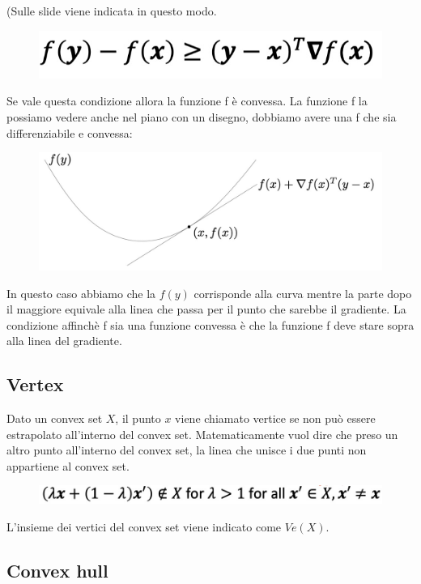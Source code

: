 \documentclass[14pt]{extreport}
\begin{document}
(Sulle slide viene indicata in questo modo.

\begin{figure}[H]
\centering
\includegraphics[width=0.7\linewidth]{227.jpeg}
\end{figure}

Se vale questa condizione allora la funzione f è convessa. La funzione f la possiamo vedere anche nel piano con un disegno, dobbiamo avere una f che
sia differenziabile e convessa:

\begin{figure}[H]
\centering
\includegraphics[width=0.7\linewidth]{228.jpeg}
\end{figure}

In questo caso abbiamo che la $f(y)$ corrisponde alla curva mentre la parte dopo il maggiore equivale alla linea che passa per il punto che sarebbe il
gradiente. La condizione affinchè f sia una funzione convessa è che la funzione f deve stare sopra alla linea del gradiente.

\subsection{Vertex}

Dato un convex set $X$, il punto $x$ viene chiamato vertice se non può essere estrapolato all'interno del convex set. Matematicamente vuol dire che
preso un altro punto all'interno del convex set, la linea che unisce i due punti non appartiene al convex set.

\begin{figure}[H]
\centering
\includegraphics[width=0.7\linewidth]{229.jpeg}
\end{figure}

L'insieme dei vertici del convex set viene indicato come $Ve(X)$.

\subsection{Convex hull}
\end{document}
